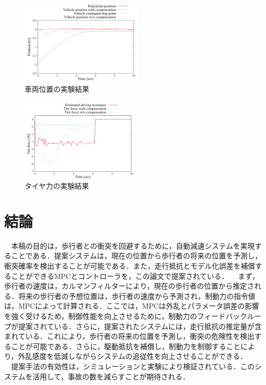 \begin{figure}[H]
    \centering
    \includegraphics[height=4cm]{./fig/fig17.png}
    \caption{車両位置の実験結果}
  \end{figure}

\begin{figure}[H]
    \centering
    \includegraphics[height=4cm]{./fig/fig18.png}
    \caption{タイヤ力の実験結果}
  \end{figure}

\section{結論}
　本稿の目的は，歩行者との衝突を回避するために，自動減速システムを実現することである．提案システムは，現在の位置から歩行者の将来の位置を予測し，衝突確率を検出することが可能である．また，走行抵抗とモデル化誤差を補償することができるMPCとコントローラを，この論文で提案されている．
　まず，歩行者の速度は，カルマンフィルターにより，現在の歩行者の位置から推定される．将来の歩行者の予想位置は，歩行者の速度から予測され，制動力の指令値は，MPCによって計算される．ここでは，MPCは外乱とパラメータ誤差の影響を強く受けるため，制御性能を向上させるために，制動力のフィードバックループが提案されている．さらに，提案されたシステムには，走行抵抗の推定量が含まれている．これにより，歩行者の将来の位置を予測し，衝突の危険性を検出することが可能である．さらに，駆動抵抗を補償し，制動力を制御することにより，外乱感度を低減しながらシステムの追従性を向上させることができる．
　提案手法の有効性は，シミュレーションと実験により検証されている．このシステムを活用して，事故の数を減らすことが期待される．


